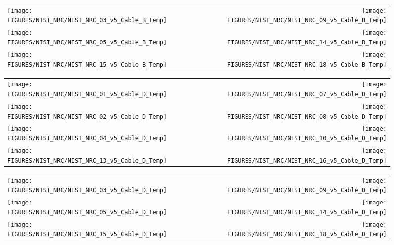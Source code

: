 \begin{figure}[h!]
\begin{tabular*}{\textwidth}{l@{\extracolsep{\fill}}r}
\texttt{[image: FIGURES/NIST\_NRC/NIST\_NRC\_03\_v5\_Cable\_B\_Temp]} &
\texttt{[image: FIGURES/NIST\_NRC/NIST\_NRC\_09\_v5\_Cable\_B\_Temp]} \\
\texttt{[image: FIGURES/NIST\_NRC/NIST\_NRC\_05\_v5\_Cable\_B\_Temp]} &
\texttt{[image: FIGURES/NIST\_NRC/NIST\_NRC\_14\_v5\_Cable\_B\_Temp]} \\
\texttt{[image: FIGURES/NIST\_NRC/NIST\_NRC\_15\_v5\_Cable\_B\_Temp]} &
\texttt{[image: FIGURES/NIST\_NRC/NIST\_NRC\_18\_v5\_Cable\_B\_Temp]}
\end{tabular*}
\label{NIST_NRC_Cable_B_Open}
\end{figure}


\begin{figure}[h!]
\begin{tabular*}{\textwidth}{l@{\extracolsep{\fill}}r}
\texttt{[image: FIGURES/NIST\_NRC/NIST\_NRC\_01\_v5\_Cable\_D\_Temp]} &
\texttt{[image: FIGURES/NIST\_NRC/NIST\_NRC\_07\_v5\_Cable\_D\_Temp]} \\
\texttt{[image: FIGURES/NIST\_NRC/NIST\_NRC\_02\_v5\_Cable\_D\_Temp]} &
\texttt{[image: FIGURES/NIST\_NRC/NIST\_NRC\_08\_v5\_Cable\_D\_Temp]} \\
\texttt{[image: FIGURES/NIST\_NRC/NIST\_NRC\_04\_v5\_Cable\_D\_Temp]} &
\texttt{[image: FIGURES/NIST\_NRC/NIST\_NRC\_10\_v5\_Cable\_D\_Temp]} \\
\texttt{[image: FIGURES/NIST\_NRC/NIST\_NRC\_13\_v5\_Cable\_D\_Temp]} &
\texttt{[image: FIGURES/NIST\_NRC/NIST\_NRC\_16\_v5\_Cable\_D\_Temp]}
\end{tabular*}
\label{NIST_NRC_Cable_D_Closed}
\end{figure}

\begin{figure}[h!]
\begin{tabular*}{\textwidth}{l@{\extracolsep{\fill}}r}
\texttt{[image: FIGURES/NIST\_NRC/NIST\_NRC\_03\_v5\_Cable\_D\_Temp]} &
\texttt{[image: FIGURES/NIST\_NRC/NIST\_NRC\_09\_v5\_Cable\_D\_Temp]} \\
\texttt{[image: FIGURES/NIST\_NRC/NIST\_NRC\_05\_v5\_Cable\_D\_Temp]} &
\texttt{[image: FIGURES/NIST\_NRC/NIST\_NRC\_14\_v5\_Cable\_D\_Temp]} \\
\texttt{[image: FIGURES/NIST\_NRC/NIST\_NRC\_15\_v5\_Cable\_D\_Temp]} &
\texttt{[image: FIGURES/NIST\_NRC/NIST\_NRC\_18\_v5\_Cable\_D\_Temp]}
\end{tabular*}
\label{NIST_NRC_Cable_D_Open}
\end{figure}

